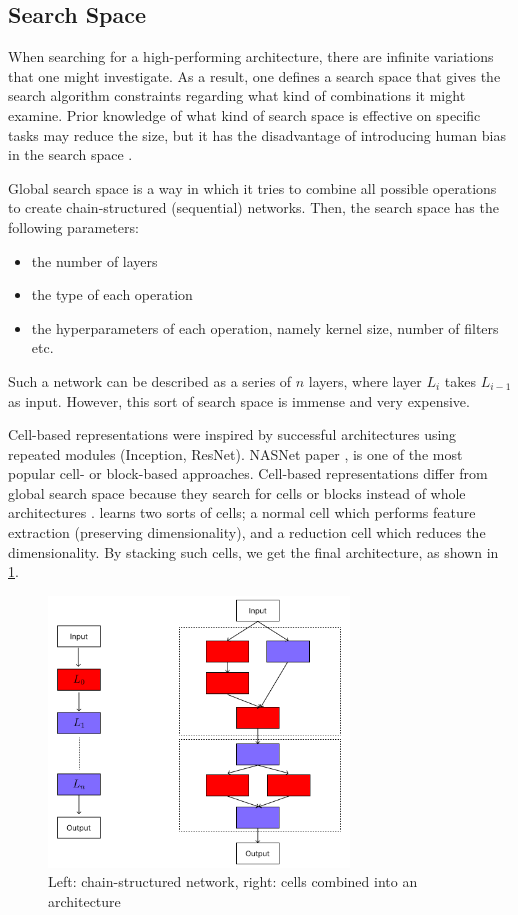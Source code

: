 \subsection{Search Space}
When searching for a high-performing architecture, there are infinite variations that one might investigate. As a result, one defines a search space that gives the search algorithm constraints regarding what kind of combinations it might examine. Prior knowledge of what kind of search space is effective on specific tasks may reduce the size, but it has the disadvantage of introducing human bias in the search space \autocite{elsken2019neural}.  

Global search space is a way in which it tries to combine all possible operations to create chain-structured (sequential) networks. Then, the search space has the following parameters:
\begin{itemize}
    \item the number of layers
    \item the type of each operation
    \item the hyperparameters of each operation, namely kernel size, number of filters etc. 
\end{itemize}

Such a network can be described as a series of $n$ layers, where layer $L_i$ takes $L_{i-1}$ as input. However, this sort of search space is immense and very expensive. 

Cell-based representations were inspired by successful architectures using repeated modules (Inception, ResNet). NASNet paper \autocite{DBLP:journals/corr/ZophVSL17}, is one of the most popular cell- or block-based approaches. Cell-based representations differ from global search space because they search for cells or blocks instead of whole architectures \autocite{elsken2019neural}. \cite{DBLP:journals/corr/ZophVSL17} learns two sorts of cells; a normal cell which performs feature extraction (preserving dimensionality), and a reduction cell which reduces the dimensionality. By stacking such cells, we get the final architecture, as shown in \cref{fig:cells}. 

\begin{figure}
    \centering
    \includegraphics[width=8cm]{figures/cells.png}
    \caption{Left: chain-structured network, right: cells combined into an architecture}
    \label{fig:cells}
\end{figure}

